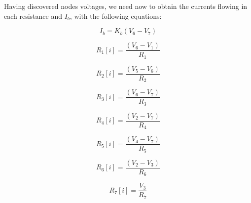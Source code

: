 \noindent Having discovered nodes voltages, we need now to obtain the currents flowing in each resistance and $I_b$, with the following equations:

\begin{equation}
I_b = K_b(V_6 - V_7)
  \label{eq:Ib}
\end{equation}

\begin{equation}
R_1[i] = \frac{(V_6 - V_1)}{R_1}
  \label{eq: iR1}
\end{equation}

\begin{equation}
R_2[i] = \frac{(V_5 - V_6)}{R_2}
  \label{eq: iR2}
\end{equation}

\begin{equation}
R_3[i] = \frac{(V_6 - V_7)}{R_3}
  \label{eq: iR3}
\end{equation}

\begin{equation}
R_4[i] = \frac{(V_2 - V_7)}{R_4}
  \label{eq: iR4}
\end{equation}

\begin{equation}
R_5[i] = \frac{(V_4 - V_7)}{R_5}
  \label{eq: iR5}
\end{equation}

\begin{equation}
R_6[i] = \frac{(V_2 - V_3)}{R_6}
  \label{eq: iR6}
\end{equation}

\begin{equation}
R_7[i] = \frac{V_3}{R_7}
  \label{eq: iR7}
\end{equation}


